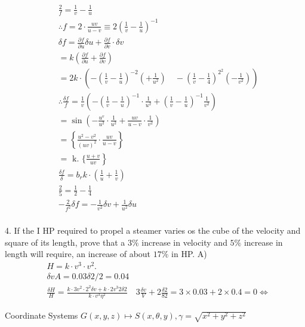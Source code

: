 \documentclass[12pt, a4paper]{article}
\begin{document}
$$
\begin{aligned}
& \frac{2}{f}=\frac{1}{v}-\frac{1}{u} \\
& \therefore f=2 \cdot \frac{u v}{u-v} \equiv 2\left(\frac{1}{v}-\frac{1}{u}\right)^{-1} \\
& \delta f=\frac{\partial f}{\partial u} \delta u+\frac{\partial f}{\partial v} \cdot \delta v \\
& =k\left(\frac{\partial f}{\partial u}+\frac{\partial f}{\partial v}\right) \\
& =2 k \cdot\left(-\left(\frac{1}{v}-\frac{1}{u}\right)^{-2}\left(+\frac{1}{u^2}\right) \quad-\left(\frac{1}{v}-\frac{1}{4}\right)^{2^2}\left(-\frac{1}{v^2}\right)\right) \\
& \therefore \frac{\delta f}{f}=\frac{1}{v}\left(-\left(\frac{1}{v}-\frac{1}{u}\right)^{-1} \cdot \frac{1}{u^2}+\left(\frac{1}{v}-\frac{1}{u}\right)^{-1} \frac{1}{v^2}\right) \\
& =\sin \left(-\frac{u^v}{u^2} \cdot \frac{1}{u^2}+\frac{u v}{u-v} \cdot \frac{1}{v^2}\right) \\
& =\left\{\frac{u^2-v^2}{(u v)^2} \cdot \frac{u v}{u-v}\right\} \\
& \left.=\text { k. \{ } \frac{u+v}{u v}\right\} \\
& \frac{\delta f}{\delta}=b_r k \cdot\left(\frac{1}{u}+\frac{1}{v}\right) \\
& \frac{2}{5}=\frac{1}{2}-\frac{1}{4} \\
& -\frac{2}{f^2} \delta f=-\frac{1}{v^2} \delta v+\frac{1}{u^2} \delta u \\
&
\end{aligned}
$$

4. If the I HP required to propel a steamer varies os the cube of the velocity and square of its length, prove that a $3 \%$ increase in velocity and $5 \%$ increase in length will require, an increase of about $17 \%$ in HP.
A)
$$
\begin{aligned}
& H=k \cdot v^3 \cdot v^2 . \\
& \delta v A=0.03 \delta 2 / 2=0.04 \\
& \frac{\delta H}{H}=\frac{k \cdot 3 v^2 \cdot 2^2 \delta v+k \cdot 2 v^3 2 \delta 2}{k \cdot v^3 \eta^2} \quad 3 \frac{\delta v}{V}+2 \frac{\delta 2}{82}=3 \times 0.03+2 \times 0.4=0 \Leftrightarrow
\end{aligned}
$$

Coordinate Systems
$G(x, y, z) \mapsto S(x, \theta, y), \gamma=\sqrt{x^{2}+y^{2}+z^{2}}$

\begin{center}
\end{center}
\end{document}
